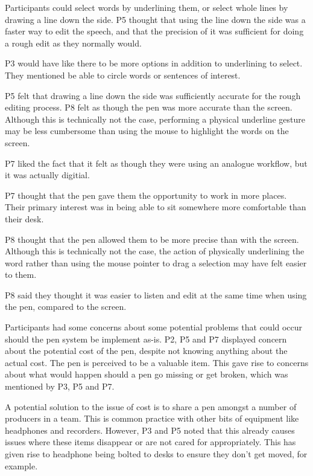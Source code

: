 
Participants could select words by underlining them, or select whole lines by drawing a line down the side. P5 thought
that using the line down the side was a faster way to edit the speech, and that the precision of it was sufficient for
doing a rough edit as they normally would.

P3 would have like there to be more options in addition to underlining to select. They mentioned be able to circle
words or sentences of interest.

P5 felt that drawing a line down the side was sufficiently accurate for the rough editing process. P8 felt as though
the pen was more accurate than the screen. Although this is technically not the case, performing a physical underline
gesture may be less cumbersome than using the mouse to highlight the words on the screen.


P7 liked the fact that it felt as though they were using an analogue workflow, but it was actually digitial.

P7 thought that the pen gave them the opportunity to work in more places. Their primary interest was in being able to
sit somewhere more comfortable than their desk.


P8 thought that the pen allowed them to be more precise than with the screen. Although this is technically not the
case, the action of physically underlining the word rather than using the mouse pointer to drag a selection may have
felt easier to them.

P8 said they thought it was easier to listen and edit at the same time when using the pen, compared to the screen.


Participants had some concerns about some potential problems that could occur should the pen system be implement as-is.
P2, P5 and P7 displayed concern about the potential cost of the pen, despite not knowing anything about the actual
cost. The pen is perceived to be a valuable item. This gave rise to concerns about what would happen should a pen go
missing or get broken, which was mentioned by P3, P5 and P7.

A potential solution to the issue of cost is to share a pen amongst a number of producers in a team. This is common
practice with other bits of equipment like headphones and recorders. However, P3 and P5 noted that this already causes
issues where these items disappear or are not cared for appropriately. This has given rise to headphone being bolted to
desks to ensure they don't get moved, for example.

